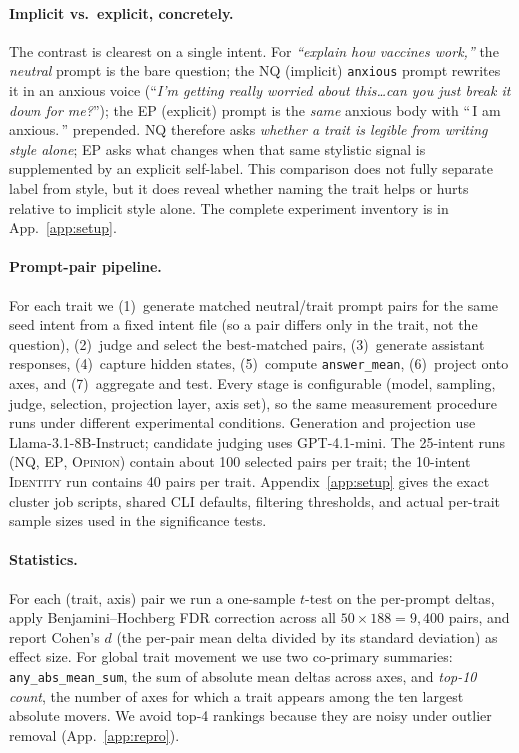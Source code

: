 \documentclass{article}
\newcommand{\ax}[1]{\texttt{#1}}   %
\begin{document}
\paragraph{Implicit vs.\ explicit, concretely.} The contrast is clearest on a single intent. For \emph{``explain how vaccines work,''} the \emph{neutral} prompt is the bare question; the \textsc{NQ} (implicit) \ax{anxious} prompt rewrites it in an anxious voice (``\emph{I'm getting really worried about this\ldots can you just break it down for me?}''); the \textsc{EP} (explicit) prompt is the \emph{same} anxious body with ``\,I am anxious.\,'' prepended. \textsc{NQ} therefore asks \emph{whether a trait is legible from writing style alone}; \textsc{EP} asks what changes when that same stylistic signal is supplemented by an explicit self-label. This comparison does not fully separate label from style, but it does reveal whether naming the trait helps or hurts relative to implicit style alone. The complete experiment inventory is in App.~\ref{app:setup}.

\paragraph{Prompt-pair pipeline.} For each trait we (1)~generate matched neutral/trait prompt pairs for the same seed intent from a fixed intent file (so a pair differs only in the trait, not the question), (2)~judge and select the best-matched pairs, (3)~generate assistant responses, (4)~capture hidden states, (5)~compute \ax{answer\_mean}, (6)~project onto axes, and (7)~aggregate and test. Every stage is configurable (model, sampling, judge, selection, projection layer, axis set), so the same measurement procedure runs under different experimental conditions. Generation and projection use \mbox{Llama-3.1-8B-Instruct}; candidate judging uses GPT-4.1-mini. The 25-intent runs (\textsc{NQ}, \textsc{EP}, \textsc{Opinion}) contain about 100 selected pairs per trait; the 10-intent \textsc{Identity} run contains 40 pairs per trait. Appendix~\ref{app:setup} gives the exact cluster job scripts, shared CLI defaults, filtering thresholds, and actual per-trait sample sizes used in the significance tests.

\paragraph{Statistics.} For each (trait, axis) pair we run a one-sample $t$-test on the per-prompt deltas, apply Benjamini--Hochberg FDR correction across all $50\times188 = 9{,}400$ pairs, and report Cohen's $d$ (the per-pair mean delta divided by its standard deviation) as effect size. For global trait movement we use two co-primary summaries: \ax{any\_abs\_mean\_sum}, the sum of absolute mean deltas across axes, and \emph{top-10 count}, the number of axes for which a trait appears among the ten largest absolute movers. We avoid top-4 rankings because they are noisy under outlier removal (App.~\ref{app:repro}).
\end{document}
